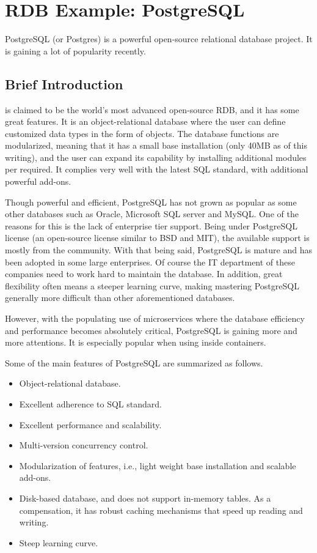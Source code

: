 

\chapter{RDB Example: PostgreSQL}

PostgreSQL (or Postgres) is a powerful open-source relational database project. It is gaining a lot of popularity recently.

\section{Brief Introduction}

 is claimed to be the world's most advanced open-source RDB, and it has some great features. It is an object-relational database where the user can define customized data types in the form of objects. The database functions are modularized, meaning that it has a small base installation (only 40MB as of this writing), and the user can expand its capability by installing additional modules per required. It complies very well with the latest SQL standard, with additional powerful add-ons.

Though powerful and efficient, PostgreSQL has not grown as popular as some other databases such as Oracle, Microsoft SQL server and MySQL. One of the reasons for this is the lack of enterprise tier support. Being under PostgreSQL license (an open-source license similar to BSD and MIT), the available support is mostly from the community. With that being said, PostgreSQL is mature and has been adopted in some large enterprises. Of course the IT department of these companies need to work hard to maintain the database. In addition, great flexibility often means a steeper learning curve, making mastering PostgreSQL generally more difficult than other aforementioned databases.

However, with the populating use of microservices where the database efficiency and performance becomes absolutely critical, PostgreSQL is gaining more and more attentions. It is especially popular when using inside containers.

Some of the main features of PostgreSQL are summarized as follows.
\begin{itemize}
	\item Object-relational database.
	\item Excellent adherence to SQL standard.
	\item Excellent performance and scalability.
	\item Multi-version concurrency control.
	\item Modularization of features, i.e., light weight base installation and scalable add-ons.
	\item Disk-based database, and does not support in-memory tables. As a compensation, it has robust caching mechanisms that speed up reading and writing.
	\item Steep learning curve.
\end{itemize}

